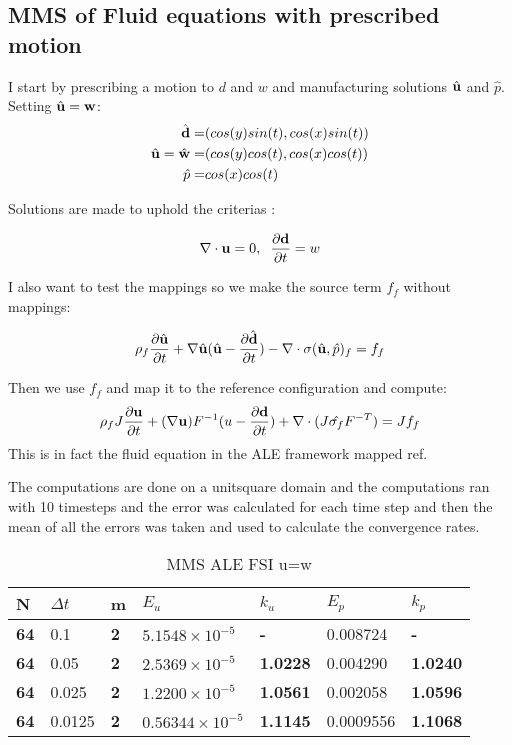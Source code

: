 \subsection{MMS of Fluid equations with prescribed motion}
I start by prescribing a motion to $ d$ and $w$ and manufacturing solutions $\hat{\bold{u}}$ and $\hat{p}$. Setting $\hat{\bold{u}} = \bold{w}$:
\begin{align*}
\hat{\bold{d}} =& ( cos(y)sin(t) , cos(x)sin(t) )\\
\hat{\bold{u}} = \hat{\bold{w}}=& ( cos(y)cos(t), cos(x)cos(t) ) \\
\hat{p} =& cos(x)cos(t)
\end{align*}

Solutions are made to uphold the criterias : 

$$ \nabla \cdot \bold{u} =0  ,\hspace{2mm} \frac{\partial \bold{d}}{\partial t} = w  $$

I also want to test the mappings so we make the source term $f_f$ without mappings:

$$ \rho_f \frac{\partial \hat{\bold{u}}}{\partial t}  +  \nabla \hat{\bold{u}} (\hat{\bold{u}} - \frac{\partial \hat{\bold{d}}}{\partial t})  -  \nabla \cdot \sigma(\hat{\bold{u}}, \hat{p})_f  = f_f $$

Then we use $f_f$ and map it to the reference configuration and compute:
$$ \rho_f J \frac{\partial \bold{u}}{\partial t} + (\nabla \bold{u})F^{-1}(u-\frac{\partial \bold{d}}{\partial t})  + \nabla \cdot( J \hat{\sigma_f} F^{-T}) = J f_f$$
This is in fact the fluid equation in the ALE framework mapped ref.

The computations are done on a unitsquare domain and the computations ran with 10 timesteps and the error was calculated for each time step and then the mean of all the errors was taken and used to calculate the convergence rates.

\begin{table}[H]
\centering
\caption{MMS ALE FSI u=w}
\label{my-label}
\begin{tabular}{|l|l|l|l|l|l|l|}
\hline
\textbf{N} & $\Delta t$ & \textbf{m} & $E_u$ & \textbf{$k_u$} & $E_p$ & \textbf{$k_p$} \\ \hline
\textbf{64} & 0.1 & \textbf{2} & $5.1548 \times 10^{-5}$ & \textbf{-} & 0.008724 & \textbf{-} \\ \hline
\textbf{64} & 0.05 & \textbf{2} & $2.5369 \times 10^{-5}$ & \textbf{1.0228} & 0.004290 & \textbf{1.0240} \\ \hline
\textbf{64} & 0.025 & \textbf{2} & $1.2200 \times 10^{-5}$ & \textbf{1.0561} & 0.002058 & \textbf{1.0596} \\ \hline
\textbf{64} & 0.0125 & \textbf{2} & $0.56344 \times 10^{-5}$ & \textbf{1.1145} & 0.0009556 & \textbf{1.1068} \\ \hline
\end{tabular}
\end{table}

